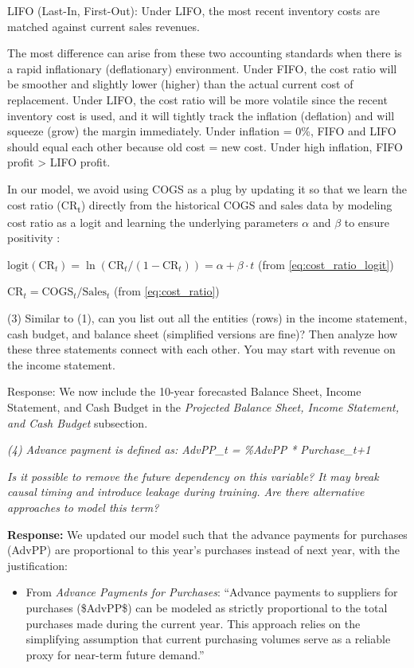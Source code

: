 \documentclass[12pt,a4paper]{article}
\begin{document}
LIFO (Last-In, First-Out): Under LIFO, the most recent inventory costs
are matched against current sales revenues.

The most difference can arise from these two accounting standards when
there is a rapid inflationary (deflationary) environment. Under FIFO,
the cost ratio will be smoother and slightly lower (higher) than the
actual current cost of replacement. Under LIFO, the cost ratio will be
more volatile since the recent inventory cost is used, and it will
tightly track the inflation (deflation) and will squeeze (grow) the
margin immediately. Under inflation = 0\%, FIFO and LIFO should equal
each other because old cost = new cost. Under high inflation, FIFO
profit \textgreater{} LIFO profit.

In our model, we avoid using COGS as a plug by updating it so that we
learn the cost ratio (CR\textsubscript{t}) directly from the historical
COGS and sales data by modeling cost ratio as a logit and learning the
underlying parameters $\alpha$ and $\beta$ to ensure positivity :

$\text{logit}(\text{CR}_t) = \ln(\text{CR}_t / (1 - \text{CR}_t)) = \alpha + \beta \cdot t$ (from \eqref{eq:cost_ratio_logit})

$\text{CR}_t = \text{COGS}_t / \text{Sales}_t$
(from \eqref{eq:cost_ratio})

(3) Similar to (1), can you list out all the entities (rows) in the
income statement, cash budget, and balance sheet (simplified versions
are fine)? Then analyze how these three statements connect with each
other. You may start with revenue on the income statement.

Response: We now include the 10-year forecasted Balance Sheet, Income
Statement, and Cash Budget in the \emph{Projected Balance Sheet, Income
Statement, and Cash Budget} subsection.

\emph{(4) Advance payment is defined as: AdvPP\_t = \%AdvPP *
Purchase\_t+1}

\emph{Is it possible to remove the future dependency on this variable?
It may break causal timing and introduce leakage during training. Are
there alternative approaches to model this term?}

\textbf{Response:} We updated our model such that the advance payments for
purchases (AdvPP) are proportional to this year's purchases instead of
next year, with the justification:

\begin{itemize}
\item
  From \emph{Advance Payments for Purchases}: ``Advance payments to
  suppliers for purchases (\$AdvPP\$) can be modeled as strictly
  proportional to the total purchases made during the current year. This
  approach relies on the simplifying assumption that current purchasing
  volumes serve as a reliable proxy for near-term future demand.''
\end{itemize}
\end{document}
